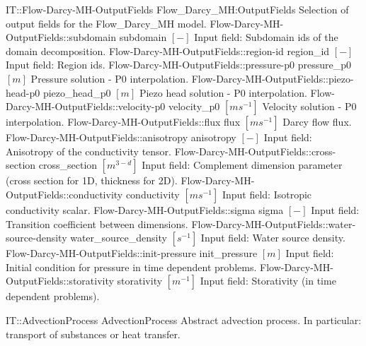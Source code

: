 \begin{SelectionType}
	{IT::Flow-Darcy-MH-OutputFields}
	{Flow{\_}Darcy{\_}MH:OutputFields}
	{{{Selection of output fields for the Flow{\_}Darcy{\_}MH model.}%
}}
		\SelectionItem
			{Flow-Darcy-MH-OutputFields::subdomain}
			{subdomain}
			{{{}{$[-]$}{ Input field: Subdomain ids of the domain decomposition.}%
}}
		\SelectionItem
			{Flow-Darcy-MH-OutputFields::region-id}
			{region{\_}id}
			{{{}{$[-]$}{ Input field: Region ids.}%
}}
		\SelectionItem
			{Flow-Darcy-MH-OutputFields::pressure-p0}
			{pressure{\_}p0}
			{{{}{$[m]$}{ Pressure solution - P0 interpolation.}%
}}
		\SelectionItem
			{Flow-Darcy-MH-OutputFields::piezo-head-p0}
			{piezo{\_}head{\_}p0}
			{{{}{$[m]$}{ Piezo head solution - P0 interpolation.}%
}}
		\SelectionItem
			{Flow-Darcy-MH-OutputFields::velocity-p0}
			{velocity{\_}p0}
			{{{}{$[ms^{-1}]$}{ Velocity solution - P0 interpolation.}%
}}
		\SelectionItem
			{Flow-Darcy-MH-OutputFields::flux}
			{flux}
			{{{}{$[ms^{-1}]$}{ Darcy flow flux.}%
}}
		\SelectionItem
			{Flow-Darcy-MH-OutputFields::anisotropy}
			{anisotropy}
			{{{}{$[-]$}{ Input field: Anisotropy of the conductivity tensor.}%
}}
		\SelectionItem
			{Flow-Darcy-MH-OutputFields::cross-section}
			{cross{\_}section}
			{{{}{$[m^{3-d}]$}{ Input field: Complement dimension parameter (cross section for 1D, thickness for 2D).}%
}}
		\SelectionItem
			{Flow-Darcy-MH-OutputFields::conductivity}
			{conductivity}
			{{{}{$[ms^{-1}]$}{ Input field: Isotropic conductivity scalar.}%
}}
		\SelectionItem
			{Flow-Darcy-MH-OutputFields::sigma}
			{sigma}
			{{{}{$[-]$}{ Input field: Transition coefficient between dimensions.}%
}}
		\SelectionItem
			{Flow-Darcy-MH-OutputFields::water-source-density}
			{water{\_}source{\_}density}
			{{{}{$[s^{-1}]$}{ Input field: Water source density.}%
}}
		\SelectionItem
			{Flow-Darcy-MH-OutputFields::init-pressure}
			{init{\_}pressure}
			{{{}{$[m]$}{ Input field: Initial condition for pressure in time dependent problems.}%
}}
		\SelectionItem
			{Flow-Darcy-MH-OutputFields::storativity}
			{storativity}
			{{{}{$[m^{-1}]$}{ Input field: Storativity (in time dependent problems).}%
}}
\end{SelectionType}
\begin{AbstractType}
	{IT::AdvectionProcess}
	{AdvectionProcess}
	{}
	{{{Abstract advection process.
In particular: transport of substances or heat transfer.}%
}}
\end{AbstractType}
